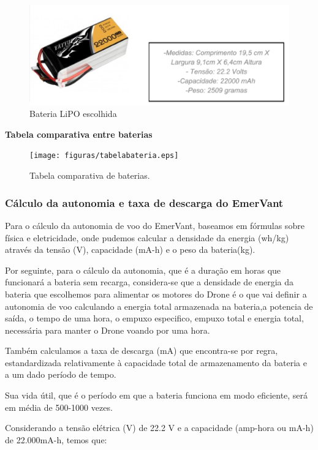 \begin{figure}[h!]
    \centering
	\includegraphics[keepaspectratio=true,scale=0.6]{figuras/baterialipo.eps}
    \caption{Bateria LiPO escolhida}
    \label{fig:baterialipo}
\end{figure}

\textbf{Tabela comparativa entre baterias}

\begin{figure}[h!]
    \centering
	\texttt{[image: figuras/tabelabateria.eps]}
    \caption{Tabela comparativa de baterias.}
    \label{fig:tabelabateria}
\end{figure}


\subsubsection{Cálculo da autonomia e taxa de descarga do EmerVant}

Para o cálculo da autonomia de voo do EmerVant, baseamos em fórmulas sobre física e eletricidade, onde pudemos calcular a densidade da energia (wh/kg) através da tensão (V), capacidade (mA-h) e o peso da bateria(kg). 

Por seguinte, para o cálculo da autonomia, que é a duração em horas que funcionará a bateria sem recarga, considera-se que a densidade de energia da bateria que escolhemos para alimentar os motores do Drone é o que vai definir a autonomia de voo calculando a energia total armazenada na bateria,a potencia de saída, o tempo de uma hora, o empuxo especifico, empuxo total e energia total, necessária para manter o Drone voando por uma hora. 

Também calculamos a taxa de descarga (mA) que encontra-se por regra, estandardizada relativamente à capacidade total de armazenamento da bateria e a um dado período de tempo.

Sua vida útil, que é o período em que a bateria funciona em modo eficiente, será em média de 500-1000 vezes.

Considerando a tensão elétrica (V) de  22.2 V e a capacidade (amp-hora ou mA-h) de 22.000mA-h, temos que: 

